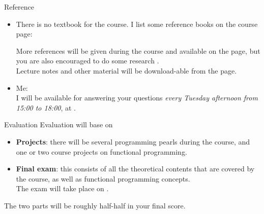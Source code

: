 \documentclass[paper=screen,mode=present,style=zysimple]{powerdot}
\begin{document}
\begin{slide}{Reference}
\begin{itemize}
\item There is no textbook for the course. I list some reference books on the course page:
\begin{center}
{\em {}}
\end{center}
More references will be given during the course and available on the page, 
but you are also encouraged to do some research .
\\
Lecture notes and other material will  be download-able from the page.
\item Me: \\
I will be available for answering your questions {\em every Tuesday afternoon from 15:00 to 18:00}, 
at .
\end{itemize}
\end{slide}

\begin{slide}[toc=]{Evaluation}
Evaluation will base on 
\begin{itemize}
\item {\bf Projects}: there will be several programming pearls during the course, 
  and one or two course projects on functional programming.
  
\item {\bf Final exam}: this consists of all the theoretical contents that are covered by the course, 
  as well as functional programming concepts. \\
  The exam will take place on .
\end{itemize}
The two parts will be roughly half-half in your final score. 
\end{slide}
\end{document}
